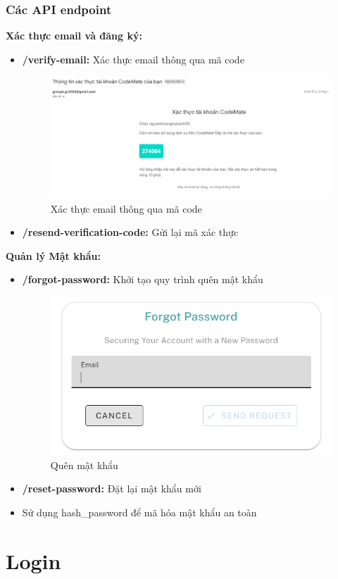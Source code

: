 \subsubsection{Các API endpoint}
\textbf{Xác thực email và đăng ký:}
\begin{itemize}
    \item \textbf{/verify-email:} Xác thực email thông qua mã code
    \begin{figure}[H]
        \centering
        \includegraphics[width=0.8\linewidth]{images/verify_email.png}
        \caption{Xác thực email thông qua mã code}
        \label{fig:enter-label}
    \end{figure}
    \item \textbf{/resend-verification-code:} Gửi lại mã xác thực
\end{itemize}
\textbf{Quản lý Mật khẩu:}
\begin{itemize}
    \item \textbf{/forgot-password:} Khởi tạo quy trình quên mật khẩu
    \begin{figure}[H]
        \centering
        \includegraphics[width=0.6\linewidth]{images/forgot_password.png}
        \caption{Quên mật khẩu}
        \label{fig:enter-label}
    \end{figure}
    \item \textbf{/reset-password:} Đặt lại mật khẩu mới
    \item Sử dụng hash\_password để mã hóa mật khẩu an toàn
\end{itemize}

\section{Login}
